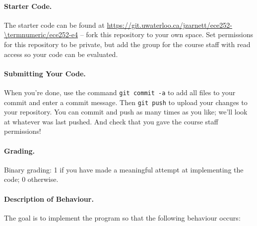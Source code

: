 \paragraph{Starter Code.} The starter code can be found at \url{https://git.uwaterloo.ca/jzarnett/ece252-\termnumeric/ece252-e4} -- fork this repository to your own space. Set permissions for this repository to be private, but add the group for the course staff with read access so your code can be evaluated.

\paragraph{Submitting Your Code.} When you're done, use the command \texttt{git commit -a} to add all files to your commit and enter a commit message. Then \texttt{git push} to upload your changes to your repository. You can commit and push as many times as you like; we'll look at whatever was last pushed. And check that you gave the course staff permissions!

\paragraph{Grading.} Binary grading: 1 if you have made a meaningful attempt at implementing the code; 0 otherwise.

\paragraph{Description of Behaviour.} The goal is to implement the program so that the following behaviour occurs:

